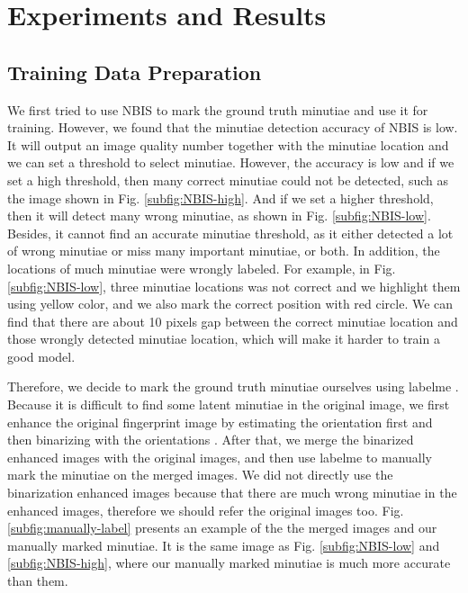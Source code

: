 \section{Experiments and Results}
\label{sec:experiment}

\subsection{Training Data Preparation}

We first tried to use NBIS \cite{NBIS} to mark the ground truth minutiae and use it for training.
However, we found that the minutiae detection accuracy of NBIS is low.
It will output an image quality number together with the minutiae location and we can set a threshold to select minutiae.
However, the accuracy is low and if we set a high threshold, then many correct minutiae could not be detected, such as the image shown in Fig. \ref{subfig:NBIS-high}.
And if we set a higher threshold, then it will detect many wrong minutiae, as shown in Fig. \ref{subfig:NBIS-low}.
Besides, it cannot find an accurate minutiae threshold, as it either detected a lot of wrong minutiae or miss many important minutiae, or both.
In addition, the locations of much minutiae were wrongly labeled.
For example, in Fig. \ref{subfig:NBIS-low}, three minutiae locations was not correct and we highlight them using yellow color, and we also mark the correct position with red circle.
We can find that there are about 10 pixels gap between the correct minutiae location and those wrongly detected minutiae location, which will make it harder to train a good model.

Therefore, we decide to mark the ground truth minutiae ourselves using labelme \cite{labelme}.
Because it is difficult to find some latent minutiae in the original image, we first enhance the original fingerprint image by estimating the orientation first and then binarizing with the orientations \cite{caoFingerprintImageEnhancement2017}.
After that, we merge the binarized enhanced images with the original images, and then use labelme to manually mark the minutiae on the merged images.
We did not directly use the binarization enhanced images because that there are much wrong minutiae in the enhanced images, therefore we should refer the original images too.
Fig. \ref{subfig:manually-label} presents an example of the the merged images and our manually marked minutiae.
It is the same image as Fig. \ref{subfig:NBIS-low} and \ref{subfig:NBIS-high}, where our manually marked minutiae is much more accurate than them.

